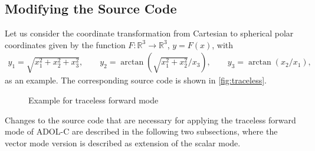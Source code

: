 \documentclass[11pt,twoside]{article}
\begin{document}
\subsection{Modifying the Source Code}
%
Let us consider the coordinate transformation from Cartesian to spherical
polar coordinates given by the function $F: \mathbb{R}^3 \to \mathbb{R}^3$, $y
= F(x)$, with
\begin{eqnarray*}
y_1  =  \sqrt{x_1^2 + x_2^2 + x_3^2},\qquad
y_2  =  \arctan\left(\sqrt{x_1^2 + x_2^2}/x_3\right),\qquad
y_3  =  \arctan(x_2/x_1),
\end{eqnarray*}
as an example. The corresponding source code is shown in \autoref{fig:traceless}.
\begin{figure}[htb]
\caption{Example for traceless forward mode}
\label{fig:traceless}
\end{figure}
%
Changes to the source code that are necessary for applying the
traceless forward mode of ADOL-C are described in the following two
subsections, where the vector mode version is described
as extension of the scalar mode. 
%
\end{document}
